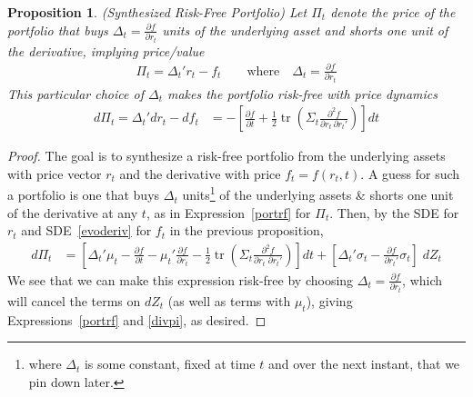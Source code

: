 \documentclass[12pt]{article}
\theoremstyle{plain}
\newtheorem{prop}[thm]{Proposition}
\theoremstyle{definition}
\theoremstyle{remark}
\newcommand{\trace}{\operatorname{tr}}
\begin{document}
\begin{prop}\emph{(Synthesized Risk-Free Portfolio)}
\label{prop:rf}
Let $\Pi_t$ denote the price of the portfolio that buys
$\Delta_t=\frac{\partial f}{\partial r_t}$ units of the underlying asset
and shorts one unit of the derivative, implying price/value
\begin{align}
  \Pi_t = \Delta_t'r_t - f_t
  \qquad\text{where}\quad
  \Delta_t = \frac{\partial f}{\partial r_t}
  \label{portrf}
\end{align}
This particular choice of $\Delta_t$ makes the portfolio risk-free with
price dynamics
\begin{align}
  d\Pi_t
  =
  \Delta_t' dr_t - df_t
  &=
  -
  \left[
  \frac{\partial f}{\partial t}
  +
  \frac{1}{2}
  \trace\left(
  \Sigma_t
  \frac{\partial^2 f}{\partial r_t\,\partial r_t'}
  \right)
  \right]dt
  \label{divpi}
\end{align}
\end{prop}
\begin{proof}
The goal is to synthesize a risk-free portfolio from the underlying
assets with price vector $r_t$ and the derivative with price
$f_t=f(r_t,t)$.
A guess for such a portfolio is one that buys $\Delta_t$
units\footnote{%
  where $\Delta_t$ is some constant, fixed at time $t$ and over the next
  instant, that we pin down later.
}
of the underlying assets \& shorts one unit of the derivative at any
$t$,
as in Expression~\ref{portrf} for $\Pi_t$.
Then, by the SDE for $r_t$ and SDE~\ref{evoderiv} for $f_t$ in the
previous proposition,
\begin{align*}
  d\Pi_t
  &=
  \left[
  \Delta_t' \mu_t
  -
  \frac{\partial f}{\partial t}
  -
  \mu_t'
  \frac{\partial f}{\partial r_t}
  -
  \frac{1}{2}
  \trace\left(
  \Sigma_t
  \frac{\partial^2 f}{\partial r_t\;\partial r_t'}
  \right)
  \right]
  dt
  +
  \left[
  \Delta_t' \sigma_t
  -
  \frac{\partial f}{\partial r_t'}
  \sigma_t
  \right]
  \;dZ_t
\end{align*}
We see that we can make this expression risk-free by choosing
$\Delta_t = \frac{\partial f}{\partial r_t}$, which will cancel the terms
on $dZ_t$ (as well as terms with $\mu_t$), giving
Expressions~\ref{portrf} and \ref{divpi}, as desired.
\end{proof}
\end{document}
